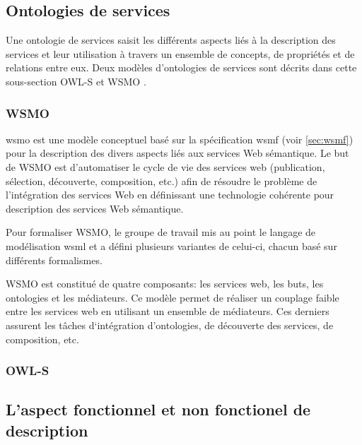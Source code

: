   \subsection{Ontologies de services}
  \label{sec:ont-services}

  Une ontologie de services saisit les différents aspects liés à la
  description des services et leur utilisation à travers un ensemble
  de concepts, de propriétés et de relations entre eux. Deux modèles
  d'ontologies de services sont décrits dans cette sous-section
  \textsc{OWL-S} et \textsc{WSMO} \cite{elie2010}.

    \subsubsection{WSMO}
    \label{sec:wsmo}

    \acrshort{wsmo} \cite{de2005web} est une modèle conceptuel basé
    sur la spécification \acrshort{wsmf} \cite{fensel2002web} (voir
    \ref{sec:wsmf}) pour la description des divers aspects liés aux
    services Web sémantique. Le but de \textsc{WSMO} est d'automatiser
    le cycle de vie des services web (publication, sélection,
    découverte, composition, etc.) afin de résoudre le problème de
    l'intégration des services Web en définissant une technologie
    cohérente pour description des services Web sémantique.

    Pour formaliser \textsc{WSMO}, le groupe de travail mis au point
    le langage de modélisation \acrshort{wsml} \cite{de2006web} et a
    défini plusieurs variantes de celui-ci, chacun basé sur différents
    formalismes.

    \textsc{WSMO} est constitué de quatre composants: les services
    web, les buts, les ontologies et les médiateurs. Ce modèle permet
    de réaliser un couplage faible entre les services web en utilisant
    un ensemble de médiateurs. Ces derniers assurent les tâches
    d‘intégration d'ontologies, de découverte des services, de
    composition, etc.

    \subsubsection{OWL-S}
    \label{sec:owl-s-1}

  \subsection{L'aspect fonctionnel et non fonctionel de description}
  \label{sec:func-vs-non-func}
  {\color{red}
    \cite{el2014cbr4wsd}
  }


